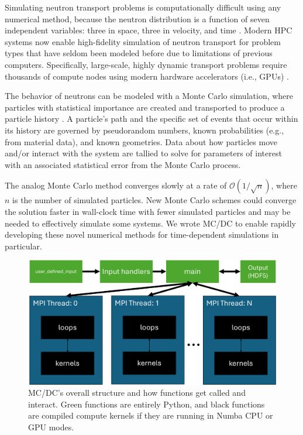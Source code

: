Simulating neutron transport problems is computationally difficult using any numerical method, because the neutron distribution is a function of seven independent variables: three in space, three in velocity, and time \cite{lewis_computational_1984}.
Modern HPC systems now enable high-fidelity simulation of neutron transport for problem types that have seldom been modeled before due to limitations of previous computers. %
Specifically, large-scale, highly dynamic transport problems require thousands of compute nodes using modern hardware accelerators (i.e., GPUs) \cite{hamilton_continuous-energy_2019, romano_openmc_2015}.

The behavior of neutrons can be modeled with a Monte Carlo simulation, where particles with statistical importance are created and transported to produce a particle history \cite{lewis_computational_1984}.
A particle's path and the specific set of events that occur within its history are governed by pseudorandom numbers, known probabilities (e.g., from material data), and known geometries.
Data about how particles move and/or interact with the system are tallied to solve for parameters of interest with an associated statistical error from the Monte Carlo process.

The analog Monte Carlo method converges slowly at a rate of $\mathcal{O}(1/\sqrt{n})$, where $n$ is the number of simulated particles.
New Monte Carlo schemes could converge the solution faster in wall-clock time with fewer simulated particles and may be needed to effectively simulate some systems.
We wrote MC/DC to enable rapidly developing these novel numerical methods for time-dependent simulations in particular.


\begin{figure}
    \centerline{\includegraphics[width=.95\textwidth]{monte_carlo/cise_paper/cise_figs/flow.pdf}}
    \caption{MC/DC's overall structure and how functions get called and interact. Green functions are entirely Python, and black functions are compiled compute kernels if they are running in Numba CPU or GPU modes.}\vspace*{-5pt}
    \label{mpi_mcdc}
\end{figure}

